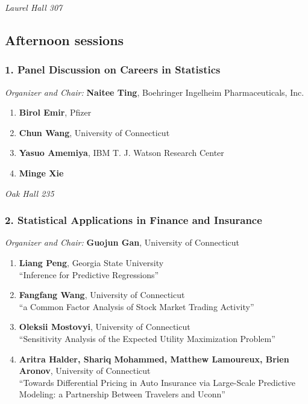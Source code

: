 \emph{Laurel Hall 307} \\[.5em]

\subsection*{Afternoon sessions}

\subsubsection*{1. Panel Discussion on Careers in Statistics}

\emph{Organizer and Chair:} \textbf{Naitee Ting}, Boehringer Ingelheim Pharmaceuticals, Inc.

\begin{enumerate}
\item \textbf{Birol Emir}, Pfizer 
\item \textbf{Chun Wang}, University of Connecticut 
\item \textbf{Yasuo Amemiya}, IBM T. J. Watson Research Center 
\item \textbf{Minge Xie} 
\end{enumerate}

\emph{Oak Hall 235} \\[.5em]

\subsubsection*{2. Statistical Applications in Finance and Insurance}

\emph{Organizer and Chair:} \textbf{Guojun Gan}, University of Connecticut

\begin{enumerate}
\item \textbf{Liang Peng}, Georgia State University \\
``Inference for Predictive Regressions''
\item \textbf{Fangfang Wang}, University of Connecticut \\
``a Common Factor Analysis of  Stock Market Trading Activity''
\item \textbf{Oleksii Mostovyi}, University of Connecticut \\
``Sensitivity Analysis of the Expected Utility Maximization Problem''
\item \textbf{Aritra Halder, Shariq Mohammed, Matthew Lamoureux, Brien Aronov}, University of Connecticut \\
``Towards Differential Pricing in Auto Insurance via Large-Scale Predictive Modeling: a Partnership Between Travelers and Uconn''
\end{enumerate}

